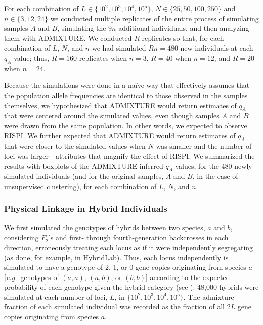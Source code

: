 For each combination of $L \in \{10^2, 10^3, 10^4, 10^5\}$,
$N \in \{25, 50, 100, 250\}$ and $n\in\{3,12,24\}$ we conducted multiple replicates
of the entire process of
simulating samples $A$ and $B$, simulating the $9n$ additional individuals, and
then analyzing them with ADMIXTURE.  We conducted $R$ replicates so that,
for each combination of $L$, $N$, and $n$ we had simulated $Rn=480$ new individuals
at each $q_A$ value; thus, $R=160$ replicates when $n = 3$, $R=40$ when $n=12$, and
$R=20$ when $n=24$.


Because the simulations were done in a na\"{i}ve way that effectively assumes that the population
allele frequencies are identical to those observed in the samples themselves, we hypothesized that ADMIXTURE would return estimates of
$q_A$ that were
centered around the simulated values, even though samples $A$ and $B$ were drawn from the same
population. In other words, we expected to observe RISPI.
We further expected that ADMIXTURE would return estimates of $q_A$ that were closer
to the simulated values when $N$ was smaller and the number of loci was larger---attributes that magnify the effect of RISPI.
We summarized the results with boxplots of the ADMIXTURE-inferred $q_A$ values,
 for the 480 newly simulated individuals (and for the original samples, $A$ and $B$, in the
 case of unsupervised clustering),
for each combination of $L$, $N$, and $n$.




\subsubsection*{Physical Linkage in Hybrid Individuals}

We first simulated the genotypes of hybrids between two species, $a$ and $b$,
considering $F_2$'s and first- through
fourth-generation backcrosses in each direction, erroneously treating each
locus as if it were independently segregating (as done, for example, in {\sc HybridLab}). Thus,
each locus independently is simulated to have a genotype of 2, 1, or 0 gene copies originating from species $a$ [{\em e.g.}~genotypes of $(a,a)$, $(a,b)$, or $(b,b)$] according to the expected
probability of each genotype given the hybrid category (see \citealt{anderson2002model}).
48,000 hybrids were simulated at each number of loci, $L$, in $\{10^2, 10^3, 10^4, 10^5\}$.
The admixture fraction of each simulated individual was recorded as the fraction of all $2L$
gene copies originating from species $a$.  

